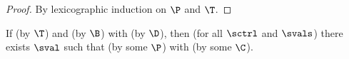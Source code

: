 \begin{proof}
By lexicographic induction on $\P$ and $\T$.


\end{proof}

\begin{lemma}[Completeness]
\label{lem:completeness-bs}
If  (by $\T$) and \bev{\benv}{\bexp}{\bval} (by $\B$) with \cor{\benv}{\senv} (by $\D$), then (for all $\sctrl$ and $\svals$) there exists $\sval$ such that  (by some $\P$) with \cor{\bval}{\sval} (by some $\C$).
\end{lemma}


